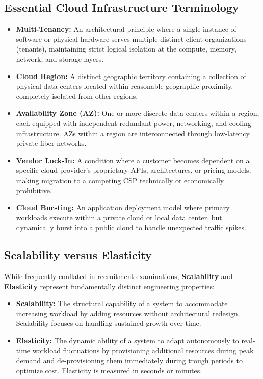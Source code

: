 \subsection{Essential Cloud Infrastructure Terminology}
\begin{itemize}
    \item \textbf{Multi-Tenancy:} An architectural principle where a single instance of software or physical hardware serves multiple distinct client organizations (tenants), maintaining strict logical isolation at the compute, memory, network, and storage layers.
    \item \textbf{Cloud Region:} A distinct geographic territory containing a collection of physical data centers located within reasonable geographic proximity, completely isolated from other regions.
    \item \textbf{Availability Zone (AZ):} One or more discrete data centers within a region, each equipped with independent redundant power, networking, and cooling infrastructure. AZs within a region are interconnected through low-latency private fiber networks.
    \item \textbf{Vendor Lock-In:} A condition where a customer becomes dependent on a specific cloud provider's proprietary APIs, architectures, or pricing models, making migration to a competing CSP technically or economically prohibitive.
    \item \textbf{Cloud Bursting:} An application deployment model where primary workloads execute within a private cloud or local data center, but dynamically burst into a public cloud to handle unexpected traffic spikes.
\end{itemize}

\subsection{Scalability versus Elasticity}
While frequently conflated in recruitment examinations, \textbf{Scalability} and \textbf{Elasticity} represent fundamentally distinct engineering properties:

\begin{itemize}
    \item \textbf{Scalability:} The structural capability of a system to accommodate increasing workload by adding resources without architectural redesign. Scalability focuses on handling sustained growth over time.
    \item \textbf{Elasticity:} The dynamic ability of a system to adapt autonomously to real-time workload fluctuations by provisioning additional resources during peak demand and de-provisioning them immediately during trough periods to optimize cost. Elasticity is measured in seconds or minutes.
\end{itemize}

